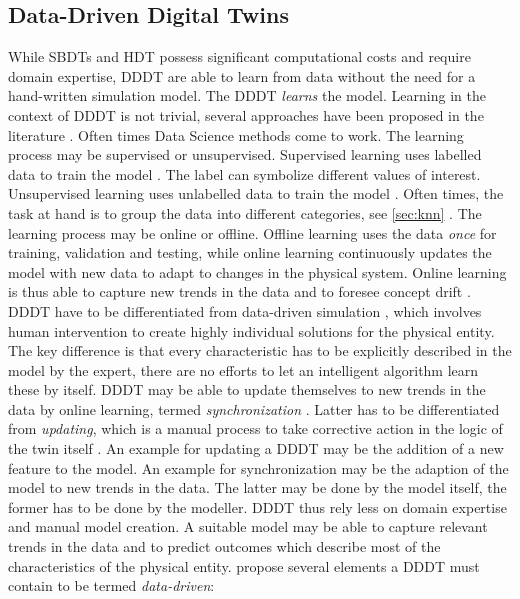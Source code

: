 \subsection*{Data-Driven Digital Twins}
\label{sec:data-driven-digital-twins}

While SBDTs and HDT possess significant computational costs and require domain expertise, DDDT are able to learn from data without the need for a hand-written simulation model. The DDDT \textit{learns} the model. Learning in the context of DDDT is not trivial, several approaches have been proposed in the literature \autocite{he2019data,Friederich2022,francis2021towards}. Often times Data Science methods come to work. The learning process may be supervised or unsupervised. Supervised learning uses labelled data to train the model \autocite{cunningham2008supervised}. The label can symbolize different values of interest. Unsupervised learning uses unlabelled data to train the model \autocite{barlow1989unsupervised}. Often times, the task at hand is to group the data into different categories, see \autoref{sec:knn} \autocite{Biesinger2019}.
The learning process may be online or offline. Offline learning uses the data \textit{once} for training, validation and testing, while online learning continuously updates the model with new data to adapt to changes in the physical system. Online learning is thus able to capture new trends in the data and to foresee concept drift \autocite{tsymbal2004problem}. DDDT have to be differentiated from data-driven simulation \autocite{Charpentier2014}, which involves human intervention to create highly individual solutions for the physical entity. The key difference is that every characteristic has to be explicitly described in the model by the expert, there are no efforts to let an intelligent algorithm learn these by itself. DDDT may be able to update themselves to new trends in the data by online learning, termed \textit{synchronization} \autocite{reinhardt2019survey}. Latter has to be differentiated from \textit{updating}, which is a manual process to take corrective action in the logic of the twin itself \autocite{schwede2024learning}. An example for updating a DDDT may be the addition of a new feature to the model. An example for synchronization may be the adaption of the model to new trends in the data. The latter may be done by the model itself, the former has to be done by the modeller.
DDDT thus rely less on domain expertise and manual model creation. A suitable model may be able to capture relevant trends in the data and to predict outcomes which describe most of the characteristics of the physical entity. \autocite{francis2021towards} propose several elements a DDDT must contain to be termed \textit{data-driven}:

